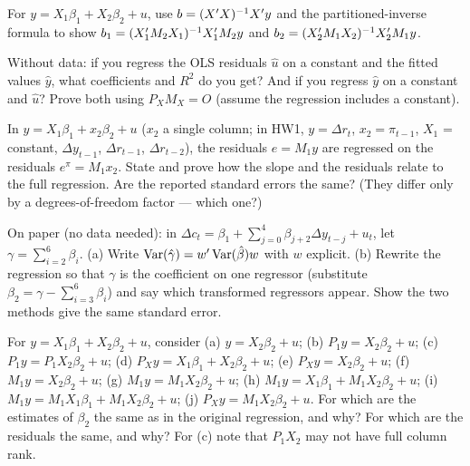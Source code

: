 \documentclass[11pt]{article}
\begin{document}
For $y = X_{1}\beta_{1} + X_{2}\beta_{2} + u$, use $b = (X^{\prime} X)^{-1}X^{\prime} y$ and
the partitioned-inverse formula to show
$b_{1} = (X_{1}^{\prime} M_{2}X_{1})^{-1}X_{1}^{\prime} M_{2}y$ and
$b_{2} = (X_{2}^{\prime} M_{1}X_{2})^{-1}X_{2}^{\prime} M_{1}y$.

Without data: if you regress the OLS residuals $\hat u$ on a constant and the
fitted values $\hat y$, what coefficients and $R^{2}$ do you get? And if you
regress $\hat y$ on a constant and $\hat u$? Prove both using $P_{X}M_{X} = O$
(assume the regression includes a constant).

In $y = X_{1}\beta_{1} + x_{2}\beta_{2} + u$ ($x_{2}$ a single column; in HW1,
$y = \Delta r_{t}$, $x_{2} = \pi_{t-1}$, $X_{1}$ = constant, $\Delta y_{t-1}$,
$\Delta r_{t-1}$, $\Delta r_{t-2}$), the residuals $e = M_{1}y$ are regressed on
the residuals $e^{\pi} = M_{1}x_{2}$. State and prove how the
slope and the residuals relate to the full regression. Are the reported
standard errors the same? (They differ only by a degrees-of-freedom factor ---
which one?)

On paper (no data needed): in $\Delta c_{t} = \beta_{1} + \sum_{j=0}^{4}\beta_{j+2}\Delta y_{t-j} + u_{t}$,
let $\gamma = \sum_{i=2}^{6}\beta_{i}$. (a) Write $\operatorname{Var}(\hat\gamma) = w^{\prime}\operatorname{Var}(\hat\beta)w$
with $w$ explicit. (b) Rewrite the regression so that $\gamma$ is the coefficient on
one regressor (substitute $\beta_{2} = \gamma - \sum_{i=3}^{6}\beta_{i}$) and say which
transformed regressors appear. Show the two methods give the same standard error.

For $y = X_{1}\beta_{1} + X_{2}\beta_{2} + u$, consider
(a) $y = X_{2}\beta_{2} + u$; (b) $P_{1}y = X_{2}\beta_{2} + u$;
(c) $P_{1}y = P_{1}X_{2}\beta_{2} + u$; (d) $P_{X}y = X_{1}\beta_{1} + X_{2}\beta_{2} + u$;
(e) $P_{X}y = X_{2}\beta_{2} + u$; (f) $M_{1}y = X_{2}\beta_{2} + u$;
(g) $M_{1}y = M_{1}X_{2}\beta_{2} + u$; (h) $M_{1}y = X_{1}\beta_{1} + M_{1}X_{2}\beta_{2} + u$;
(i) $M_{1}y = M_{1}X_{1}\beta_{1} + M_{1}X_{2}\beta_{2} + u$; (j) $P_{X}y = M_{1}X_{2}\beta_{2} + u$.
For which are the estimates of $\beta_{2}$ the same as in the original regression,
and why? For which are the residuals the same, and why? For (c) note that
$P_{1}X_{2}$ may not have full column rank.
\end{document}
